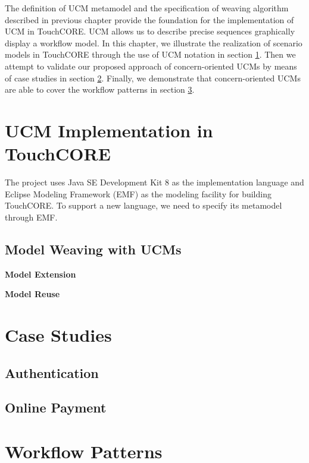 The definition of UCM metamodel and the specification of weaving algorithm described in previous chapter provide the foundation for the implementation of UCM in TouchCORE. UCM allows us to describe precise sequences graphically display a workflow model. In this chapter, we illustrate the realization of scenario models in TouchCORE through the use of UCM notation in section \ref{sec:4.1}. Then we attempt to validate our proposed approach of concern-oriented UCMs by means of case studies in section \ref{sec:4.2}. Finally, we demonstrate that concern-oriented UCMs are able to cover the workflow patterns in section \ref{sec:4.3}.

\section{UCM Implementation in TouchCORE} \label{sec:4.1}


The project uses Java SE Development Kit 8 as the implementation language and Eclipse Modeling Framework (EMF) \cite{steinberg2008emf} as the modeling facility for building TouchCORE. To support a new language, we need to specify its metamodel through EMF.

\subsection{Model Weaving with UCMs}

\textbf{Model Extension}

\textbf{Model Reuse}

\section{Case Studies} \label{sec:4.2}

\subsection{Authentication}

\subsection{Online Payment}

\section{Workflow Patterns} \label{sec:4.3}

